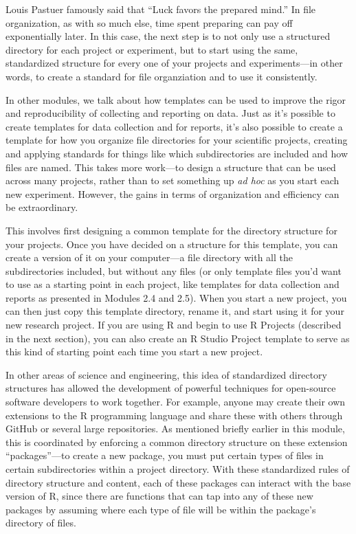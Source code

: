\documentclass[]{tufte-book}
\begin{document}
Louis Pastuer famously said that ``Luck favors the prepared mind.'' In file
organization, as with so much else, time spent preparing can pay off
exponentially later. In this case, the next step is to not only use a structured
directory for each project or experiment, but to start using the same,
standardized structure for every one of your projects and experiments---in other
words, to create a standard for file organziation and to use it consistently.

In other modules, we talk about how templates can be used to improve the rigor
and reproducibility of collecting and reporting on data. Just as it's possible
to create templates for data collection and for reports, it's also possible to
create a template for how you organize file directories for your scientific
projects, creating and applying standards for things like which subdirectories
are included and how files are named. This takes more work---to design a
structure that can be used across many projects, rather than to set something
up \emph{ad hoc} as you start each new experiment. However, the gains in terms of
organization and efficiency can be extraordinary.

This involves first designing a common template for the directory structure for
your projects. Once you have decided on a structure for this template, you can
create a version of it on your computer---a file directory with all the
subdirectories included, but without any files (or only template files you'd
want to use as a starting point in each project, like templates for data
collection and reports as presented in Modules 2.4 and 2.5). When you start a
new project, you can then just copy this template directory, rename it, and
start using it for your new research project. If you are using R and begin to
use R Projects (described in the next section), you can also create an R Studio
Project template to serve as this kind of starting point each time you start a
new project.

In other areas of science and engineering, this idea of standardized directory
structures has allowed the development of powerful techniques for open-source
software developers to work together. For example, anyone may create their own
extensions to the R programming language and share these with others through
GitHub or several large repositories. As mentioned briefly earlier in this
module, this is coordinated by enforcing a common directory structure on these
extension ``packages''---to create a new package, you must put certain types of
files in certain subdirectories within a project directory. With these
standardized rules of directory structure and content, each of these packages
can interact with the base version of R, since there are functions that can tap
into any of these new packages by assuming where each type of file will be
within the package's directory of files.
\end{document}
